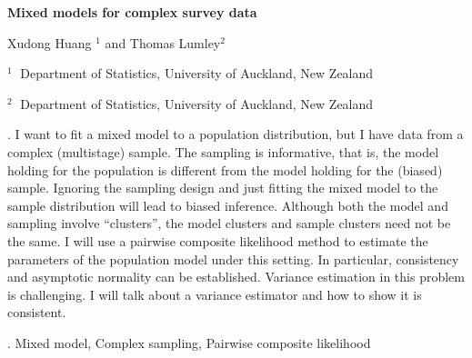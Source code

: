 \documentclass[12pt]{article}
\begin{document}
\begin{flushleft}


{\LARGE\bf Mixed models for complex survey data}


\vspace{1.0cm}

Xudong Huang $^1$ and Thomas Lumley$^2$

\begin{description}

\item $^1 \;$ Department of Statistics, University of Auckland,
New Zealand

\item $^2 \;$ Department of Statistics, University of Auckland,
New Zealand

\end{description}

\end{flushleft}


\vspace{0.75cm}

. I want to fit a mixed model to a population distribution, but I have data from a complex (multistage) sample. The sampling is informative, that is, the model holding for the population is different from the model holding for the (biased) sample. Ignoring the sampling design and just fitting the mixed model to the sample distribution will lead to biased inference. Although both the model and sampling involve “clusters”, the model clusters and sample clusters need not be the same.  I will use a pairwise composite likelihood method to estimate the parameters of the population model under this setting. In particular, consistency and asymptotic normality can be established. Variance estimation in this problem is challenging. I will talk about a variance estimator and how to show it is consistent. 


\vskip 2mm

.
Mixed model, Complex sampling, Pairwise composite likelihood
\end{document}
